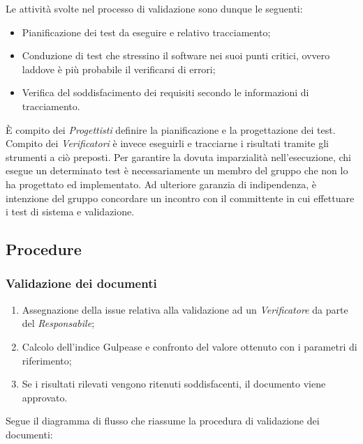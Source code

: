 \documentclass[../NormediProgetto.tex]{subfiles}
\begin{document}
\noindent Le attività svolte nel processo di validazione sono dunque le seguenti:

\begin{itemize}
    \item Pianificazione dei test da eseguire e relativo tracciamento;
    
    \item Conduzione di test che stressino il software nei suoi punti critici, ovvero laddove è più probabile il verificarsi di errori;
    
    \item Verifica del soddisfacimento dei requisiti secondo le informazioni di tracciamento.
\end{itemize}

È compito dei \textit{Progettisti} definire la pianificazione e la progettazione dei test. Compito dei \textit{Verificatori} è invece eseguirli e tracciarne i risultati tramite gli strumenti a ciò preposti. Per garantire la dovuta imparzialità nell'esecuzione, chi esegue un determinato test è necessariamente un membro del gruppo che non lo ha progettato ed implementato. Ad ulteriore garanzia di indipendenza, è intenzione del gruppo concordare un incontro con il committente in cui effettuare i test di sistema e validazione.

\subsection{Procedure}

\subsubsection{Validazione dei documenti}

\begin{enumerate}
    \item Assegnazione della issue relativa alla validazione ad un \textit{Verificatore} da parte del \textit{Responsabile};
    
    \item Calcolo dell'indice Gulpease e confronto del valore ottenuto con i parametri di riferimento;
    
    \item Se i risultati rilevati vengono ritenuti soddisfacenti, il documento viene approvato.
\end{enumerate}
    
Segue il diagramma di flusso che riassume la procedura di validazione dei documenti:
\end{document}
